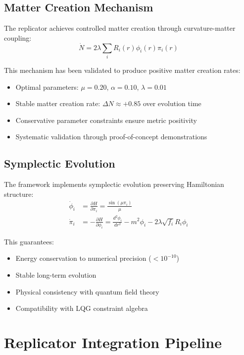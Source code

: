 \documentclass[11pt]{article}
\begin{document}
\subsection{Matter Creation Mechanism}

The replicator achieves controlled matter creation through curvature-matter coupling:
\begin{equation}
\dot{N} = 2\lambda \sum_i R_i(r) \phi_i(r) \pi_i(r)
\end{equation}

This mechanism has been validated to produce positive matter creation rates:
\begin{itemize}
\item Optimal parameters: $\mu = 0.20$, $\alpha = 0.10$, $\lambda = 0.01$
\item Stable matter creation rate: $\Delta N \approx +0.85$ over evolution time
\item Conservative parameter constraints ensure metric positivity
\item Systematic validation through proof-of-concept demonstrations
\end{itemize}

\subsection{Symplectic Evolution}

The framework implements symplectic evolution preserving Hamiltonian structure:
\begin{align}
\dot{\phi}_i &= \frac{\partial H}{\partial \pi_i} = \frac{\sin(\mu\pi_i)}{\mu} \\
\dot{\pi}_i &= -\frac{\partial H}{\partial \phi_i} = \frac{d^2\phi_i}{dr^2} - m^2\phi_i - 2\lambda\sqrt{f_i}R_i\phi_i
\end{align}

This guarantees:
\begin{itemize}
\item Energy conservation to numerical precision ($<10^{-10}$)
\item Stable long-term evolution
\item Physical consistency with quantum field theory
\item Compatibility with LQG constraint algebra
\end{itemize}

\section{Replicator Integration Pipeline}
\end{document}
